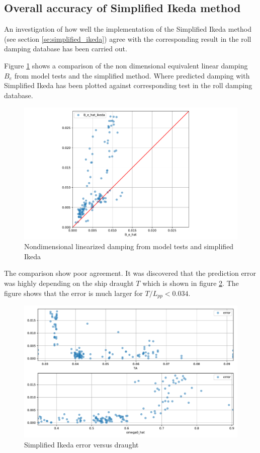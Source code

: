 \subsection{Overall accuracy of Simplified Ikeda method}
\label{se:overall_comparison}
An investigation of how well the implementation of the Simplified Ikeda method (see section \ref{se:simplified_ikeda}) agree with the corresponding result in the roll damping database has been carried out.

Figure \ref{fig:B_e_hat_ikeda} shows a comparison of the non dimensional equivalent linear damping $\hat{B_e}$
from model tests and the simplified method. Where predicted damping with Simplified Ikeda has been plotted against corresponding test in the roll damping database.  

\begin{figure}[H]
    \centering
    \includegraphics[width=\columnwidth]{figures/B_e_hat_ikeda.pdf}
    \caption{Nondimensional linearized damping from model tests and simplified Ikeda}
    \label{fig:B_e_hat_ikeda}
\end{figure}

The comparison show poor agreement. It was discovered that the prediction error was highly depending on the ship draught $T$ which is shown in figure  \ref{fig:B_e_hat_error}.
The figure shows that the error is much larger for $T/L_{pp}<0.034$.

\begin{figure}[H]
    \centering
    \includegraphics[width=\columnwidth]{figures/B_e_hat_error.pdf}
    \caption{Simplified Ikeda error versus draught}
    \label{fig:B_e_hat_error}
\end{figure}

